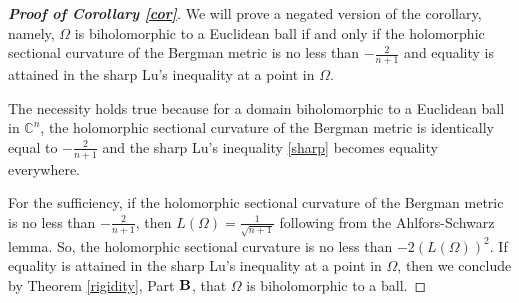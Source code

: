 \documentclass[10pt,a4paper]{amsart}
\begin{document}
  \begin{proof} [{\bf Proof of Corollary \ref{cor}}]
  
We will prove a negated version of the corollary, namely,
$\Omega$ is biholomorphic to a Euclidean ball if and only if the holomorphic sectional curvature of the Bergman metric is no less than  $-\frac{2}{n+1}$ and equality is attained in the sharp Lu's inequality at a point in $\Omega$.

 \medskip



The necessity holds true because for a domain 
biholomorphic to a Euclidean ball in $\mathbb{C}^n$, the 
holomorphic sectional curvature of the Bergman metric is identically equal to  $-\frac{2}{n+1}$
and  the sharp Lu's inequality \eqref{sharp} becomes equality everywhere.


\medskip

For the sufficiency, if the holomorphic sectional curvature of the Bergman metric is no less than  $-\frac{2}{n+1}$, then  \(L(\Omega) = \frac{1}{\sqrt{n+1}}\) following from the Ahlfors-Schwarz lemma. So, the holomorphic sectional curvature is no less than $-2(L(\Omega))^2$. If equality is attained in the sharp Lu's inequality at a point in $\Omega$, then  we conclude by Theorem \ref{rigidity}, Part {$\bf B$}, that $\Omega$ is biholomorphic to a  ball.


\end{proof}
\end{document}
